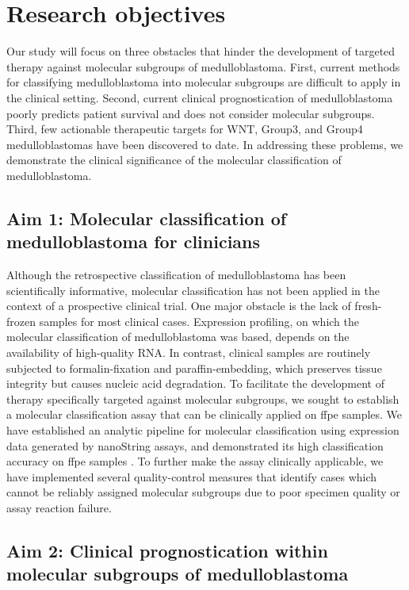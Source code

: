 \section{Research objectives}

Our study will focus on three obstacles that hinder the development of targeted therapy against molecular subgroups of medulloblastoma. First, current methods for classifying medulloblastoma into molecular subgroups are difficult to apply in the clinical setting. Second, current clinical prognostication of medulloblastoma poorly predicts patient survival and does not consider molecular subgroups. Third, few actionable therapeutic targets for WNT, Group3, and Group4 medulloblastomas have been discovered to date. In addressing these problems, we demonstrate the clinical significance of the molecular classification of medulloblastoma.

\subsection*{Aim 1: Molecular classification of medulloblastoma for clinicians}

Although the retrospective classification of medulloblastoma has been scientifically informative, molecular classification has not been applied in the context of a prospective clinical trial. One major obstacle is the lack of fresh-frozen samples for most clinical cases. Expression profiling, on which the molecular classification of medulloblastoma was based, depends on the availability of high-quality RNA. In contrast, clinical samples are routinely subjected to formalin-fixation and paraffin-embedding, which preserves tissue integrity but causes nucleic acid degradation. To facilitate the development of therapy specifically targeted against molecular subgroups, we sought to establish a molecular classification assay that can be clinically applied on \gls{ffpe} samples. We have established an analytic pipeline for molecular classification using expression data generated by nanoString assays, and demonstrated its high classification accuracy on \gls{ffpe} samples . To further make the assay clinically applicable, we have implemented several quality-control measures that identify cases which cannot be reliably assigned molecular subgroups due to poor specimen quality or assay reaction failure.

\subsection*{Aim 2: Clinical prognostication within molecular subgroups of medulloblastoma}

